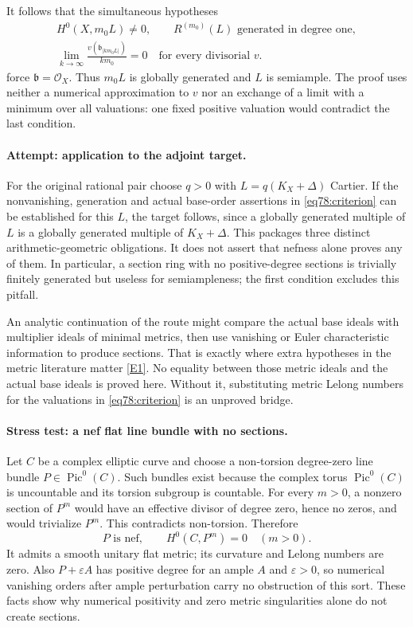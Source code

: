 \documentclass[11pt,a4paper]{article}
\numberwithin{equation}{section}
\newcommand{\eref}[2]{\hyperlink{extra:#1:#2}{[E#2]}}
\begin{document}
It follows that the simultaneous hypotheses
\begin{equation}\label{eq78:criterion}
 \begin{gathered}
 H^0(X,m_0L)\ne0,\qquad R^{(m_0)}(L)\text{ generated in degree one},\\
 \lim_{k\to\infty}\frac{v(\mathfrak b_{|km_0L|})}{km_0}=0
       \quad\text{for every divisorial }v.
 \end{gathered}
\end{equation}
force $\mathfrak b=\mathcal O_X$. Thus $m_0L$ is globally generated and
$L$ is semiample. The proof uses neither a numerical approximation to
$v$ nor an exchange of a limit with a minimum over all valuations: one
fixed positive valuation would contradict the last condition.

\paragraph{Attempt: application to the adjoint target.}
For the original rational pair choose $q>0$ with
$L=q(K_X+\Delta)$ Cartier. If the nonvanishing, generation and actual
base-order assertions in \eqref{eq78:criterion} can be established for
this $L$, the target follows, since a globally generated multiple of $L$
is a globally generated multiple of $K_X+\Delta$.
This packages three distinct arithmetic-geometric obligations. It does
not assert that nefness alone proves any of them. In particular, a section
ring with no positive-degree sections is trivially finitely generated but
useless for semiampleness; the first condition excludes this pitfall.

An analytic continuation of the route might compare the actual base ideals
with multiplier ideals of minimal metrics, then use vanishing or Euler
characteristic information to produce sections. That is exactly where
extra hypotheses in the metric literature matter \eref{78}{1}.
No equality between those metric ideals and the actual base ideals is
proved here. Without it, substituting metric Lelong numbers for the
valuations in \eqref{eq78:criterion} is an unproved bridge.

\paragraph{Stress test: a nef flat line bundle with no sections.}
Let $C$ be a complex elliptic curve and choose a non-torsion degree-zero
line bundle $P\in\operatorname{Pic}^0(C)$. Such bundles exist because the
complex torus $\operatorname{Pic}^0(C)$ is uncountable and its torsion
subgroup is countable. For every $m>0$, a nonzero section of $P^m$ would
have an effective divisor of degree zero, hence no zeros, and would
trivialize $P^m$. This contradicts non-torsion. Therefore
\[
 P\text{ is nef},\qquad H^0(C,P^m)=0\quad(m>0).
\]
It admits a smooth unitary flat metric; its curvature and Lelong numbers
are zero. Also $P+\varepsilon A$ has positive degree for an ample $A$
and $\varepsilon>0$, so numerical vanishing orders after ample perturbation
carry no obstruction of this sort. These facts show why numerical
positivity and zero metric singularities alone do not create sections.
\end{document}
